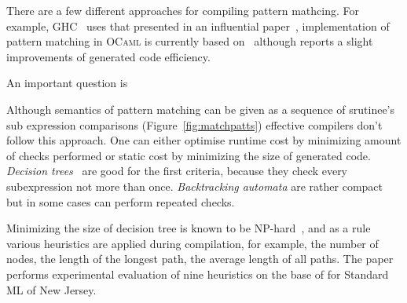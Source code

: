 \begin{comment}
\begin{figure}[ht]
\begin{minipage}[b]{0.3\linewidth}
\centering
\label{fig:figure1}
\end{minipage}
\hspace{0.5cm}
\begin{minipage}[b]{0.3\linewidth}
\centering
\begin{lstlisting}
switch x with 
| true -> 
    switch y with 
    | true -> 
       switch z with 
       | true -> 4
       | _ -> 3
    | _ -> 
      switch z with 
      | true -> 1
      | _ -> 3 
| _ -> 
   switch y with 
   | true -> 2 
   | _ -> if z then 1 else 3
\end{lstlisting}
\end{minipage}
\hspace{0.5cm}
\begin{minipage}[b]{0.3\linewidth}
\centering
\end{minipage}
\end{figure}
\end{comment}

There are a few different approaches for compiling pattern mathcing. For example, \textsc{GHC}~\cite{?} uses that presented in an influential paper~\cite{Jones1987},
implementation of pattern matching in \textsc{OCaml} is currently based on~\cite{maranget2001} although \cite{maranget2008} reports a slight improvements
of generated code efficiency. 

An important question is

Although semantics of pattern matching can be given as a sequence of srutinee's sub expression comparisons (Figure~\ref{fig:matchpatts}) effective compilers don't follow
this approach. One can either optimise runtime cost by minimizing amount of checks performed or static cost by minimizing the size of generated code. \emph{Decision trees}~\cite{?}
are good for the first criteria, because they check every subexpression not more than once. \emph{Backtracking automata} are rather compact but in some cases can perform
repeated checks.

Minimizing the size of decision tree is known to be NP-hard~\cite{baudinet1985tree}, and as a rule various heuristics are applied during compilation, for example, the number of nodes,
the length of the longest path, the average length of all paths. The paper~\cite{Scott2000WhenDM} performs experimental evaluation of nine heuristics on the base of for
Standard ML of New Jersey.

